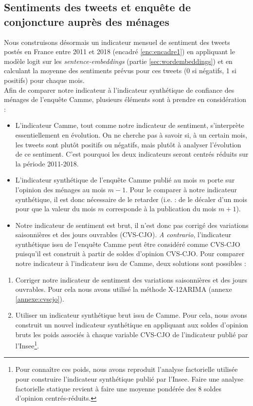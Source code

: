 \documentclass[11pt,french,french]{article}
\let\rmarkdownfootnote\footnote%
\def\footnote{\protect\rmarkdownfootnote}
\begin{document}
\subsection{Sentiments des tweets et enquête de conjoncture auprès des
ménages}\label{sec:camme}

Nous construisons désormais un indicateur mensuel de sentiment des
tweets postés en France entre 2011 et 2018 (encadré \ref{enc:encadre1})
en appliquant le modèle logit sur les \emph{sentence-embeddings} (partie
\ref{sec:wordembeddings}) et en calculant la moyenne des sentiments
prévus pour ces tweets (0 si négatifs, 1 si positifs) pour chaque
mois.\\
Afin de comparer notre indicateur à l'indicateur synthétique de
confiance des ménages de l'enquête Camme, plusieurs éléments sont à
prendre en considération :

\begin{itemize}
\item
  L'indicateur Camme, tout comme notre indicateur de sentiment,
  s'interprète essentiellement en évolution. On ne cherche pas à savoir
  si, à un certain mois, les tweets sont plutôt positifs ou négatifs,
  mais plutôt à analyser l'évolution de ce sentiment. C'est pourquoi les
  deux indicateurs seront centrés réduits sur la période 2011-2018.
\item
  L'indicateur synthétique de l'enquête Camme publié au mois \(m\) porte
  sur l'opinion des ménages au mois \(m-1\). Pour le comparer à notre
  indicateur synthétique, il est donc nécessaire de le retarder (i.e. :
  de le décaler d'un mois pour que la valeur du mois \(m\) corresponde à
  la publication du mois \(m+1\)).
\item
  Notre indicateur de sentiment est brut, il n'est donc pas corrigé des
  variations saisonnières et des jours ouvrables (CVS-CJO). \emph{A
  contrario}, l'indicateur synthétique issu de l'enquête Camme peut être
  considéré comme CVS-CJO puisqu'il est construit à partir de soldes
  d'opinion CVS-CJO. Pour comparer notre indicateur à l'indicateur issu
  de Camme, deux solutions sont possibles :
\end{itemize}

\begin{enumerate}
\def\labelenumi{\arabic{enumi}.}
\item
  Corriger notre indicateur de sentiment des variations saisonnières et
  des jours ouvrables. Pour cela nous avons utilisé la méthode X-12ARIMA
  (annexe \ref{annexe:cvscjo}).
\item
  Utiliser un indicateur synthétique brut issu de Camme. Pour cela, nous
  avons construit un nouvel indicateur synthétique en appliquant aux
  soldes d'opinion bruts les poids associés à chaque variable CVS-CJO de
  l'indicateur publié par l'Insee\footnote{Pour connaître ces poids,
    nous avons reproduit l'analyse factorielle utilisée pour construire
    l'indicateur synthétique publié par l'Insee. Faire une analyse
    factorielle statique revient à faire une moyenne pondérée des 8
    soldes d'opinion centrés-réduits.}.
\end{enumerate}
\end{document}
